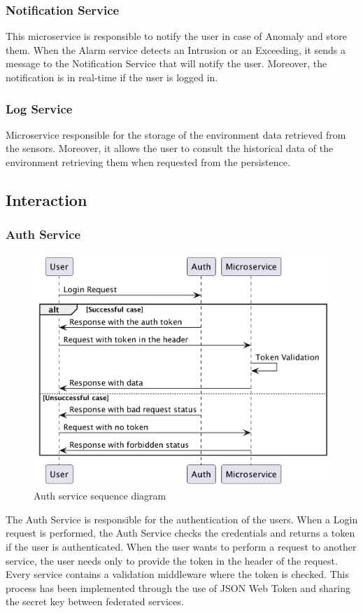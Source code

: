 \documentclass{scrartcl}
\begin{document}
    \subsubsection{Notification Service}
    This microservice is responsible to notify the user in case of Anomaly and store them.
    When the Alarm service detects an Intrusion or an Exceeding, it sends a message to the Notification Service that will notify the user.
    Moreover, the notification is in real-time if the user is logged in.

    \subsubsection{Log Service}
    Microservice responsible for the storage of the environment data retrieved from the sensors.
    Moreover, it allows the user to consult the historical data of the environment retrieving them when requested from the persistence.

    \subsection{Interaction}

    \subsubsection{Auth Service}
    \begin{figure}
        \centering
        \includegraphics[scale=0.3]{img/auth-service-sequence}
        \caption{Auth service sequence diagram}
        \label{fig:auth-service-sequence}
    \end{figure}
    The Auth Service is responsible for the authentication of the users.
    When a Login request is performed, the Auth Service checks the credentials and returns a token if the user is authenticated.
    When the user wants to perform a request to another service, the user needs only to provide the token in the header of the request.
    Every service contains a validation middleware where the token is checked.
    This process has been implemented through the use of JSON Web Token and sharing the secret key between federated services.
\end{document}
